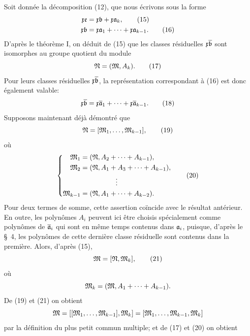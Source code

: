 Soit donnée la décomposition (12), que nous écrivons sous la forme
\begin{align}
 \mathfrak{x}\mathfrak{e}&=\mathfrak{x}\mathfrak{b}+\mathfrak{x}\mathfrak{a}_k,\tag{15}\\
 \mathfrak{x}\mathfrak{b}&=\mathfrak{x}\mathfrak{a}_1+\cdots+\mathfrak{x}\mathfrak{a}_{k-1}.\tag{16}
\end{align}
D'après le théorème I, on déduit de (15) que les classes résiduelles $\mathfrak{x}\overline{\mathfrak{b}}$ sont isomorphes au groupe quotient du module
\begin{equation}
 \mathfrak{N}=(\mathfrak{M},A_k).
\tag{17}
\end{equation}
Pour leurs classes résiduelles $\mathfrak{x}\overline{\mathfrak{b}}$, la représentation correspondant à (16) est donc également valable:
\begin{equation}
 \mathfrak{x}\overline{\mathfrak{b}}=\mathfrak{x}\overline{\mathfrak{a}}_1+\cdots+\mathfrak{x}\overline{\mathfrak{a}}_{k-1}.
\tag{18}
\end{equation}
Supposons maintenant déjà démontré que
\begin{equation}
 \mathfrak{N}=[\mathfrak{M}_1,\ldots,\mathfrak{M}_{k-1}],
\tag{19}
\end{equation}
où
\begin{equation}
\left\{
\begin{aligned}
 \mathfrak{M}_1&=(\mathfrak{N},A_2+\cdots+A_{k-1}),\\
 \mathfrak{M}_2&=(\mathfrak{N},A_1+A_3+\cdots+A_{k-1}),\\
 &\hspace{1.8cm}\vdots\\
 \mathfrak{M}_{k-1}&=(\mathfrak{N},A_1+\cdots+A_{k-2}).
\end{aligned}\right.
\tag{20}
\end{equation}
Pour deux termes de somme, cette assertion coïncide avec le résultat antérieur. En outre, les polynômes $A_i$ peuvent ici être choisis spécialement comme polynômes de $\overline{\mathfrak{a}}_i$ qui sont en même temps contenus dans $\mathfrak{a}_i$, puisque, d'après le \S~4, les polynômes de cette dernière classe résiduelle sont contenus dans la première. Alors, d'après (15),
\begin{equation}
 \mathfrak{M}=[\mathfrak{N},\mathfrak{M}_k],
\tag{21}
\end{equation}
où
\[
 \mathfrak{M}_k=(\mathfrak{M},A_1+\cdots+A_{k-1}).
\]
De (19) et (21) on obtient
\[
 \mathfrak{M}=[[\mathfrak{M}_1,
 \ldots,\mathfrak{M}_{k-1}],\mathfrak{M}_k]=[\mathfrak{M}_1,\ldots,\mathfrak{M}_{k-1},\mathfrak{M}_k]
\]
par la définition du plus petit commun multiple; et de (17) et (20) on obtient
